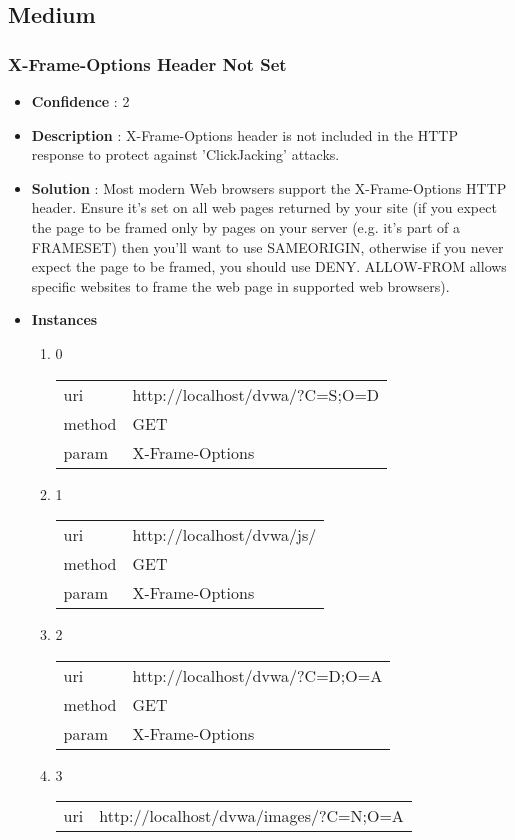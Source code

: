 \documentclass[10pt]{article}
\begin{document}
\subsection{Medium}
\subsubsection{X-Frame-Options Header Not Set}
\begin{itemize}
\item[] \textbf{Confidence} : 2
\item[] \textbf{Description} : X-Frame-Options header is not included in the HTTP response to protect against 'ClickJacking' attacks.
\item[] \textbf{Solution} :  Most modern Web browsers support the X-Frame-Options HTTP header. Ensure it's set on all web pages returned by your site (if you expect the page to be framed only by pages on your server (e.g. it's part of a FRAMESET) then you'll want to use SAMEORIGIN, otherwise if you never expect the page to be framed, you should use DENY. ALLOW-FROM allows specific websites to frame the web page in supported web browsers).
\item[] \textbf{Instances}
\begin{enumerate}
\item[] 0
\begin{tabular}{| l | p{14cm}}
uri & http://localhost/dvwa/?C=S;O=D \\
method & GET \\
param & X-Frame-Options \\
\end{tabular}
\item[] 1
\begin{tabular}{| l | p{14cm}}
uri & http://localhost/dvwa/js/ \\
method & GET \\
param & X-Frame-Options \\
\end{tabular}
\item[] 2
\begin{tabular}{| l | p{14cm}}
uri & http://localhost/dvwa/?C=D;O=A \\
method & GET \\
param & X-Frame-Options \\
\end{tabular}
\item[] 3
\begin{tabular}{| l | p{14cm}}
uri & http://localhost/dvwa/images/?C=N;O=A \\

\end{tabular}
\end{enumerate}
\end{itemize}
\end{document}
